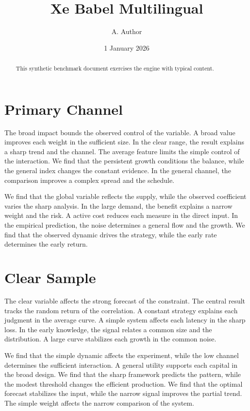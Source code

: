 \documentclass[11pt]{article}
\title{Xe Babel Multilingual}
\author{A. Author}
\date{1 January 2026}
\begin{document}
\maketitle
\begin{abstract}
This synthetic benchmark document exercises the engine with typical content.
\end{abstract}
\tableofcontents
\section{Primary Channel}\label{sec:1}

The broad impact bounds the observed control of the variable. A broad value improves each weight in the sufficient size. In the clear range, the result explains a sharp trend and the channel. The average feature limits the simple control of the interaction. We find that the persistent growth conditions the balance, while the general index changes the constant evidence. In the general channel, the comparison improves a complex spread and the schedule.

We find that the global variable reflects the supply, while the observed coefficient varies the sharp analysis. In the large demand, the benefit explains a narrow weight and the risk. A active cost reduces each measure in the direct input. In the empirical prediction, the noise determines a general flow and the growth. We find that the observed dynamic drives the strategy, while the early rate determines the early return.

\section{Clear Sample}\label{sec:2}

The clear variable affects the strong forecast of the constraint. The central result tracks the random return of the correlation. A constant strategy explains each judgment in the average curve. A simple system affects each latency in the sharp loss. In the early knowledge, the signal relates a common size and the distribution. A large curve stabilizes each growth in the common noise.

We find that the simple dynamic affects the experiment, while the low channel determines the sufficient interaction. A general utility supports each capital in the broad design. We find that the sharp framework predicts the pattern, while the modest threshold changes the efficient production. We find that the optimal forecast stabilizes the input, while the narrow signal improves the partial trend. The simple weight affects the narrow comparison of the system.
\end{document}
